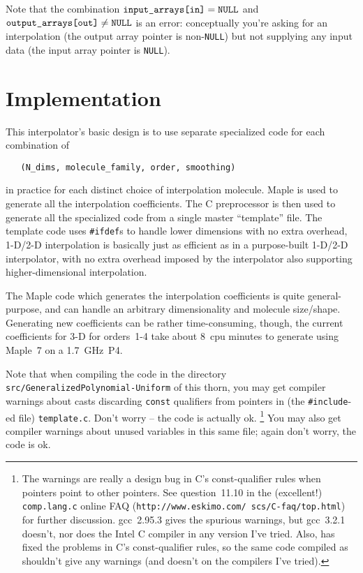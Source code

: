 Note that the combination
$\verb|input_arrays[in]| = \verb|NULL|$ and
$\verb|output_arrays[out]| \ne \verb|NULL|$ is an error: conceptually
you're asking for an interpolation (the output array pointer is
non-\verb|NULL|) but not supplying any input data (the input array
pointer is \verb|NULL|).


\section{Implementation}

This interpolator's basic design is to use separate specialized code
for each combination of
\begin{verbatim}
   (N_dims, molecule_family, order, smoothing)
\end{verbatim}
\ie{} in practice for each distinct choice of interpolation molecule.
Maple is used to generate all the interpolation coefficients.
The C preprocessor is then used to generate all the specialized code
from a single master ``template'' file.  The template code uses
\verb|#ifdef|s to handle lower dimensions with no extra overhead,
\eg{} 1-D/2-D interpolation is basically just as efficient as in
a purpose-built 1-D/2-D interpolator, with no extra overhead imposed
by the interpolator also supporting higher-dimensional interpolation.

The Maple code which generates the interpolation coefficients is quite
general-purpose, and can handle an arbitrary dimensionality and molecule
size/shape.  Generating new coefficients can be rather time-consuming,
though, \eg{} the current coefficients for 3-D for orders~1-4
take about 8~cpu minutes to generate using Maple~7 on a 1.7~GHz~P4.

Note that when compiling the code in the directory
\verb|src/GeneralizedPolynomial-Uniform| of this thorn, you may get
compiler warnings about casts discarding \verb|const| qualifiers from
pointers in (the \verb|#include|-ed file) \verb|template.c|.  Don't
worry -- the code is actually ok.%
\footnote{%
	 The warnings are really a design bug in C's
	 const-qualifier rules when pointers point to
	 other pointers.  See question~11.10 in the
	 (excellent!) {\tt comp.lang.c} online FAQ
	 ({\tt http://www.eskimo.com/~scs/C-faq/top.html})
	 for further discussion.  gcc~2.95.3 gives the
	 spurious warnings, but gcc~3.2.1 doesn't, nor
	 does the Intel C compiler in any version I've
	 tried.  Also, \Cplusplus{} has fixed the problems
	 in C's const-qualifier rules, so the same code
	 compiled as \Cplusplus{} shouldn't give any
	 warnings (and doesn't on the compilers I've tried).
	 }%
{}  You may also get compiler warnings about unused variables in
this same file; again don't worry, the code is ok.

